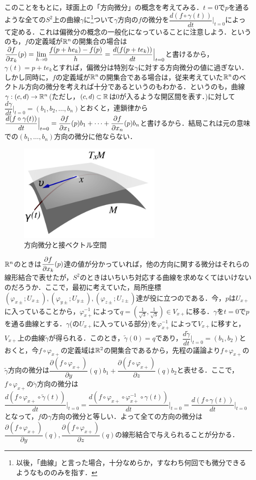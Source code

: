 このことをもとに，球面上の「方向微分」の概念を考えてみる．$t=0$で$p$を通るような全ての$S^2$上の曲線$\gamma$に\footnote{以後，「曲線」と言った場合，十分なめらか，すなわち何回でも微分できるようなもののみを指す．}ついて$\gamma$方向の$f$の微分を$\dfrac{d(f\circ\gamma(t))}{dt}\Big|_{t=0}$によって定める．これは偏微分の概念の一般化になっていることに注意しよう．というのも，$f$の定義域が${\mathbb R}^n$の開集合の場合は$\displaystyle\frac{\partial f}{\partial x_k}(p)=\lim_{h\rightarrow 0}\displaystyle\frac{f(p+he_k)-f(p)}{h}=\displaystyle\frac{d(f(p+te_k))}{dt}\Big|_{t=0}$と書けるから，$\gamma(t)=p+te_k$とすれば，偏微分は特別な$\gamma$に対する方向微分の値に過ぎない．しかし同時に，$f$の定義域が${\mathbb R}^n$の開集合である場合は，従来考えていた${\mathbb R}^n$のベクトル方向の微分を考えれば十分であるというのもわかる．というのも，曲線$\gamma:(c,d)\rightarrow {\mathbb R}^n$(ただし，$(c,d)\subset{\mathbb R}$は0が入るような開区間を表す．)に対して$\dfrac{d\gamma}{dt}\Big|_{t=0}=(b_1,b_2,\dots,b_n)$とおくと，連鎖律から$\displaystyle\frac{d(f\circ\gamma(t))}{dt}\Big|_{t=0}=\displaystyle\frac{\partial f}{\partial x_1}(p) b_1+\dots+\displaystyle\frac{\partial f}{\partial x_n}(p) b_n$と書けるから．結局これは元の意味での$(b_1,\dots,b_n)$方向の微分に他ならない．
\begin{figure}[h]
  \begin{center} 
    \includegraphics[width=7.0cm]{dev_tangentvec}
    \caption{方向微分と接ベクトル空間}
  \end{center}
\end{figure}


${\mathbb R}^n$のときは$\displaystyle\frac{\partial f}{\partial x_k}(p)$達の値が分かっていれば，他の方向に関する微分はそれらの線形結合で表せたが，$S^2$のときはいちいち対応する曲線を求めなくてはいけないのだろうか．ここで，最初に考えていた，局所座標$(\varphi_{x\pm};U_{x\pm}),(\varphi_{y\pm};U_{y\pm}),(\varphi_{z\pm};U_{z\pm})$達が役に立つのである．今，$p$は$U_{x+}$に入っていることから，$\varphi_{x+}^{-1}$によって$q=(\frac{1}{\sqrt{3}},\frac{1}{\sqrt{3}})\in V_{x+}$に移る．$\gamma$を$t=0$で$p$を通る曲線とする．$\gamma$(の$U_{x+}$に入っている部分)を$\varphi_{x+}^{-1}$によって$V_{x+}$に移すと，$V_{x+}$上の曲線$\tilde{\gamma}$が得られる．このとき，$\tilde{\gamma}(0)=q$であり，$\dfrac{d\tilde{\gamma}}{dt}\Big|_{t=0}=(b_1,b_2)$とおくと，今$f\circ \varphi_{x+}$の定義域は${\mathbb R}^2$の開集合であるから，先程の議論より$f\circ\varphi_{x+}$の$\tilde{\gamma}$方向の微分は$\dfrac{\partial (f\circ\varphi_{x+})}{\partial y}(q)b_1+\dfrac{\partial (f\circ\varphi_{x+})}{\partial z}(q)b_2$と表せる．ここで，$f\circ \varphi_{x+}$の$\tilde{\gamma}$方向の微分は$\dfrac{d(f\circ\varphi_{x+}\circ\tilde{\gamma}(t))}{dt}\Big|_{t=0}=\dfrac{d(f\circ\varphi_{x+}\circ\varphi_{x+}^{-1}\circ\gamma(t))}{dt}\Big|_{t=0}=\dfrac{d(f\circ\gamma(t))}{dt}\Big|_{t=0}$となって，$f$の$\gamma$方向の微分と等しい．よって全ての方向の微分は$\dfrac{\partial (f\circ\varphi_{x+})}{\partial y}(q),\dfrac{\partial (f\circ\varphi_{x+})}{\partial z}(q)$の線形結合で与えられることが分かる．


